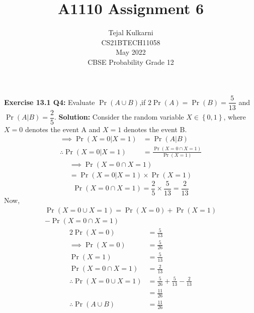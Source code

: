 \documentclass[journal,12pt,two column]{IEEEtran}
\title{A1110 Assignment 6 }
\author{Tejal Kulkarni \\ CS21BTECH11058 \\\vspace*{20pt} May 2022 \\ CBSE Probability Grade 12 }
\begin{document}
\newcommand{\solution}{\noindent \textbf{Solution: }}
\providecommand{\pr}[1]{\ensuremath{\Pr\left(#1\right)}}
\providecommand{\qfunc}[1]{\ensuremath{Q\left(#1\right)}}
\providecommand{\sbrak}[1]{\ensuremath{{}\left[#1\right]}}
\providecommand{\lsbrak}[1]{\ensuremath{{}\left[#1\right.}}
\providecommand{\rsbrak}[1]{\ensuremath{{}\left.#1\right]}}
\providecommand{\brak}[1]{\ensuremath{\left(#1\right)}}
\providecommand{\lbrak}[1]{\ensuremath{\left(#1\right.}}
\providecommand{\rbrak}[1]{\ensuremath{\left.#1\right)}}
\providecommand{\cbrak}[1]{\ensuremath{\left\{#1\right\}}}
\providecommand{\lcbrak}[1]{\ensuremath{\left\{#1\right.}}
\providecommand{\rcbrak}[1]{\ensuremath{\left.#1\right\}}}
\newcommand*{\permcomb}[4][0mu]{{{}^{#3}\mkern#1#2_{#4}}}
\newcommand*{\perm}[1][-3mu]{\permcomb[#1]{P}}
\newcommand*{\comb}[1][-1mu]{\permcomb[#1]{C}}
\renewcommand{\thetable}{\arabic{table}} 

\maketitle

\textbf{Exercise 13.1 Q4:} Evaluate $\pr{A \cup B}$,if $2\pr{A} = \pr{B} = \dfrac{5}{13}$ and $\pr{A|B} = \dfrac{2}{5}$. 
\solution
Consider the random variable $X\in \cbrak{0,1}$, where $X = 0$ denotes the event A and $X=1$ denotes the event B. 
\begin{align}
 \implies \pr{X=0|X=1} &= \pr{A|B}  \\ 
 \therefore \pr{X=0|X=1} &= \frac{\pr{X=0\cap X=1}}{\pr{X=1}} 
\end{align}
\begin{multline}
    \implies \pr{X=0\cap X=1} \\
          =\pr{X=0|X=1}\times{\pr{X=1}} 
\end{multline}
\begin{equation}
    \pr{X=0\cap X=1} = \frac{2}{5}\times \frac{5}{13} = \frac{2}{13}
\end{equation}
Now,
\begin{multline}
    \pr{X=0\cup X=1} = \pr{X = 0} + \pr{X = 1} \\ - \pr{X=0\cap X=1} 
\end{multline}
\begin{align}
  2\pr{X = 0} &= \frac{5}{13} \\
  \implies \pr{X = 0} &= \frac{5}{26} \\
  \pr{X = 1} &= \frac{5}{13} \\
  \pr{X=0\cap X=1} &= \frac{2}{13} \\
  \therefore \pr{X=0\cup X=1} &= \frac{5}{26} + \frac{5}{13} - \frac{2}{13}\\
                              &= \frac{11}{26} \\
  \therefore \pr{A \cup B} &= \boxed{\frac{11}{26}}
\end{align}

    
\end{document}
